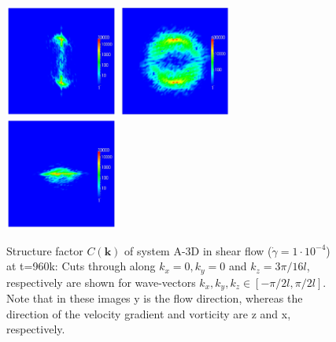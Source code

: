 \documentclass[8.5pt,twoside,twocolumn]{article}
\begin{document}
\begin{figure}[htp!]
\centering
\includegraphics[angle=0,width=0.33\textwidth]{ck_x-slice_run788_960.jpg}
\includegraphics[angle=0,width=0.33\textwidth]{ck_y-slice_run788_960.jpg}
\includegraphics[angle=0,width=0.33\textwidth]{ck_z-slice_run788_960.jpg}
\caption{Structure factor $C({\mathbf k})$ of system A-3D in shear flow ($\dot{\gamma}=1\cdot10^{-4}$) at t=960k: Cuts through along $k_x=0,k_y=0$ and $k_z=3\pi/16 l$, respectively are shown for wave-vectors $k_x, k_y, k_z\in[-\pi/2 l,\pi/2 l]$. Note that in these images y is the flow direction, whereas the direction of the velocity gradient and vorticity are z and x, respectively.}
\label{fig14}
\end{figure}
\end{document}
